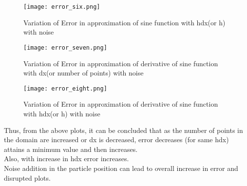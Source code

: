 \documentclass{article}
\begin{document}
\begin{figure}[H] \label{figure}
\texttt{[image: error\_six.png]}
\caption{Variation of Error in approximation of sine function with hdx(or h) with noise}
\label{figure:}
\end{figure}

\begin{figure}[H] \label{figure}
\texttt{[image: error\_seven.png]}
\caption{Variation of Error in approximation of derivative of sine function with dx(or number of points) with noise}
\label{figure:}
\end{figure}

\begin{figure}[H] \label{figure}
\texttt{[image: error\_eight.png]}
\caption{Variation of Error in approximation of derivative of sine function with hdx(or h) with noise}
\label{figure:}
\end{figure}
 
Thus, from the above plots, it can be concluded that as the number of points in the domain are increased or dx is decreased, error decreases (for same hdx) attains a minimum value and then increases.
\\
Also, with increase in hdx error increases.
\\
Noise addition in the particle position can lead to overall increase in error and disrupted plots.
\end{document}
